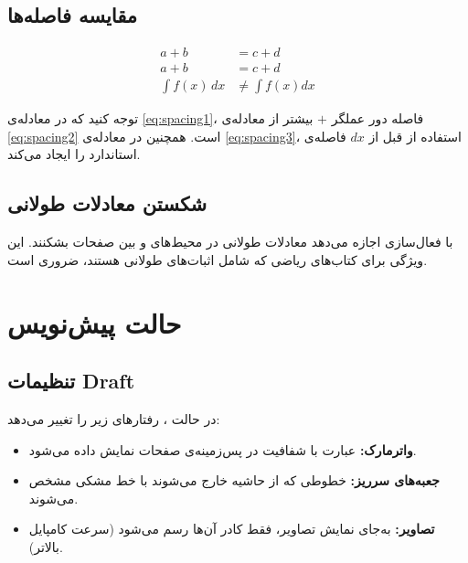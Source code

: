 \documentclass{matinbook}
\begin{document}
\section{مقایسه فاصله‌ها}
\label{sec:typography-math-comparison}

\begin{align}
    a + b &= c + d \label{eq:spacing1} \\
    a+b &= c+d \label{eq:spacing2} \\
    \int f(x) \, dx &\neq \int f(x) dx \label{eq:spacing3}
\end{align}

توجه کنید که در معادله‌ی \cref{eq:spacing1}، فاصله دور
عملگر $+$ بیشتر از معادله‌ی \cref{eq:spacing2} است.
همچنین در معادله‌ی \cref{eq:spacing3}، استفاده از
\lr{\textbackslash ,} قبل از $dx$ فاصله‌ی استاندارد
را ایجاد می‌کند.

\section{شکستن معادلات طولانی}
\label{sec:typography-math-breaks}

 با فعال‌سازی
 اجازه می‌دهد
معادلات طولانی در محیط‌های  و 
بین صفحات بشکنند. این ویژگی برای کتاب‌های ریاضی که
شامل اثبات‌های طولانی هستند، ضروری است.

\chapter{حالت پیش‌نویس}
\label{chap:typography-draft}

\section{تنظیمات Draft}
\label{sec:typography-draft-settings}

در حالت ،  رفتارهای زیر را تغییر
می‌دهد:

\begin{itemize}
    \item \textbf{واترمارک:} عبارت  با شفافیت
     در پس‌زمینه‌ی صفحات نمایش داده می‌شود.
    \item \textbf{جعبه‌های سرریز:} خطوطی که از حاشیه خارج
    می‌شوند با خط مشکی \pnum{۵pt} مشخص می‌شوند.
    \item \textbf{تصاویر:} به‌جای نمایش تصاویر، فقط
    کادر آن‌ها رسم می‌شود (سرعت کامپایل بالاتر).
\end{itemize}
\end{document}
